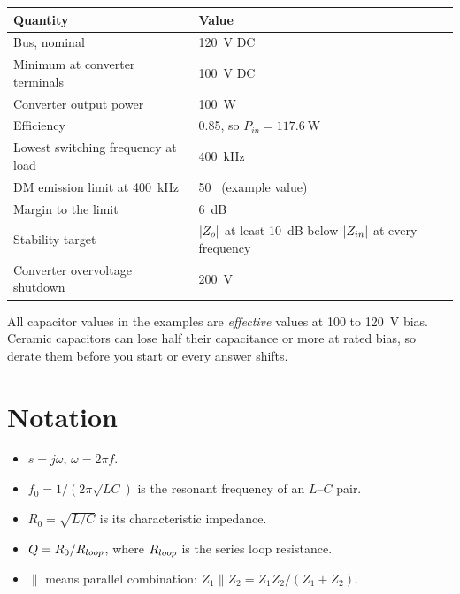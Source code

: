 \begin{center}
	\begin{tabular}{@{}ll@{}}
		\toprule
		Quantity                              & Value                                                            \\
		\midrule
		Bus, nominal                          & \qty{120}{\volt} DC                                              \\
		Minimum at converter terminals        & \qty{100}{\volt} DC                                              \\
		Converter output power                & \qty{100}{\watt}                                                  \\
		Efficiency                            & 0.85, so $P_{in} = \qty{117.6}{\watt}$                           \\
		Lowest switching frequency at load    & \qty{400}{\kilo\hertz}                                           \\
		DM emission limit at \qty{400}{\kHz}  & 50~\dBuA{} (example value)                                       \\
		Margin to the limit                   & 6~dB                                                             \\
		Stability target                      & $\lvert Z_o\rvert$ at least 10~dB below $\lvert Z_{in}\rvert$ at every frequency \\
		Converter overvoltage shutdown        & \qty{200}{\volt}                                                 \\
		\bottomrule
	\end{tabular}
\end{center}

All capacitor values in the examples are \emph{effective} values at 100 to
\qty{120}{\volt} bias. Ceramic capacitors can lose half their capacitance or
more at rated bias, so derate them before you start or every answer shifts.

\section{Notation}

\begin{itemize}
	\item $s = j\omega$, $\omega = 2\pi f$.
	\item $f_0 = 1/(2\pi\sqrt{LC})$ is the resonant frequency of an $L$--$C$ pair.
	\item $R_0 = \sqrt{L/C}$ is its characteristic impedance.
	\item $Q = R_0/R_{loop}$, where $R_{loop}$ is the series loop resistance.
	\item $\parallel$ means parallel combination: $Z_1 \parallel Z_2 = Z_1Z_2/(Z_1+Z_2)$.
\end{itemize}

